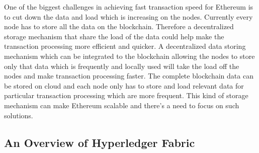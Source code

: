 One of the biggest challenges in achieving fast transaction speed for Ethereum is to cut down the data and load which is increasing on the nodes. Currently every node has to store all the data on the blockchain. Therefore a decentralized storage mechanism that share the load of the data could help make the transaction processing more efficient and quicker. A decentralized data storing mechanism which can be integrated to the blockchain allowing the nodes to store only that data which is frequently and locally used will take the load off the nodes and make transaction processing faster. The complete blockchain data can be stored on cloud and each node only has to store and load relevant data for particular transaction processing which are more frequent. This kind of storage mechanism can make Ethereum scalable and there’s a need to focus on such solutions.

\subsection{An Overview of Hyperledger Fabric}
